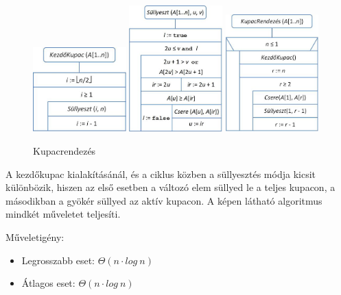 \documentclass[12pt,margin=0px]{article}
\begin{document}
	\begin{figure}[H]
		\centering
		\includegraphics[width=0.32\textwidth]{img/heapsort_start.png}
		\includegraphics[width=0.32\textwidth]{img/heapsort_pulldown.png}
		\includegraphics[width=0.32\textwidth]{img/heapsort.png}
		\caption{Kupacrendezés}
	\end{figure}
	
    \noindent A kezdőkupac kialakításánál, és a ciklus közben a süllyesztés módja kicsit különbözik, hiszen az első esetben a változó elem süllyed le a teljes kupacon, a másodikban a gyökér süllyed az aktív kupacon. A képen látható algoritmus mindkét műveletet teljesíti.
	
    \noindent Műveletigény:
    \begin{itemize}
        \item Legrosszabb eset: $\Theta(n \cdot log\ n)$
        \item Átlagos eset: $\Theta(n \cdot log\ n)$
    \end{itemize}
\end{document}
